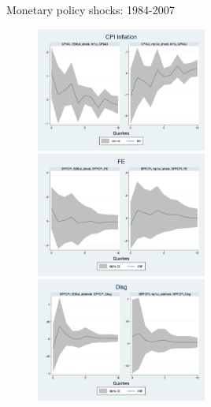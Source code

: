 \documentclass{beamer}
\begin{document}
\begin{frame}{Monetary policy shocks: 1984-2007}

\begin{figure}
	\includegraphics[width=0.5\textwidth,totalheight=0.28\textheight]{figuresDraft/CPIAU_ashocks_before2007.png}  \\
	\smallskip 
	\includegraphics[width=0.5\textwidth,totalheight=0.28\textheight]{figuresDraft/SPFFE_ashocks_before2007.png} \\
	\smallskip
	\includegraphics[width=0.5\textwidth,totalheight=0.28\textheight]{figuresDraft/SPFDisg_ab_ashocks_before2007.png} 
\end{figure}

\end{frame}
\end{document}
